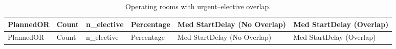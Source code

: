\documentclass[
]{article}
\begin{document}
\begin{longtable}[]{@{}
  >{\centering\arraybackslash}p{}
  >{\centering\arraybackslash}p{}
  >{\centering\arraybackslash}p{}
  >{\centering\arraybackslash}p{}
  >{\centering\arraybackslash}p{}
  >{\centering\arraybackslash}p{}@{}}
\caption{Operating rooms with urgent--elective overlap.
\label{tab:or_overlap}}\tabularnewline
\toprule\noalign{}
\begin{minipage}[b]{\linewidth}\centering
PlannedOR
\end{minipage} & \begin{minipage}[b]{\linewidth}\centering
Count
\end{minipage} & \begin{minipage}[b]{\linewidth}\centering
n\_elective
\end{minipage} & \begin{minipage}[b]{\linewidth}\centering
Percentage
\end{minipage} & \begin{minipage}[b]{\linewidth}\centering
Med StartDelay (No Overlap)
\end{minipage} & \begin{minipage}[b]{\linewidth}\centering
Med StartDelay (Overlap)
\end{minipage} \\
\midrule\noalign{}
\endfirsthead
\toprule\noalign{}
\begin{minipage}[b]{\linewidth}\centering
PlannedOR
\end{minipage} & \begin{minipage}[b]{\linewidth}\centering
Count
\end{minipage} & \begin{minipage}[b]{\linewidth}\centering
n\_elective
\end{minipage} & \begin{minipage}[b]{\linewidth}\centering
Percentage
\end{minipage} & \begin{minipage}[b]{\linewidth}\centering
Med StartDelay (No Overlap)
\end{minipage} & \begin{minipage}[b]{\linewidth}\centering
Med StartDelay (Overlap)
\end{minipage} \\

\end{longtable}
\end{document}
